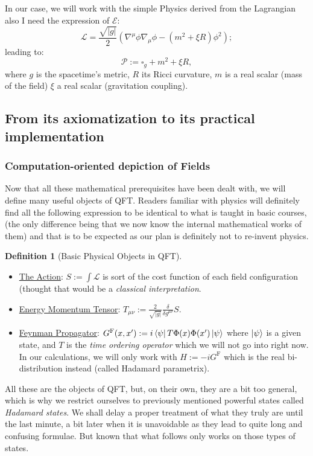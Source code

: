 \documentclass[a4paper,11pt]{article}
\numberwithin{equation}{section}
\theoremstyle{definition}
\newtheorem{definition}{Definition}
\begin{document}
        In our case, we will work with the simple Physics derived from the Lagrangian \color{red} also I need the expression of $\mathcal{E}$\color{black}:
        $$\mathcal{L}=\frac{\sqrt{|g|}}{2}\left(\nabla^\mu\phi\nabla_\mu\phi- (m^2+\xi R)\phi^2\right);$$
        leading to:
        $$\mathcal{P}:=\square_g + m^2 + \xi R,$$
        where $g$ is the spacetime's metric, $R$ its Ricci curvature, $m$ is a real scalar (mass of the field) $\xi$ a real scalar (gravitation coupling).

        
\subsection{From its axiomatization to its practical implementation}
\subsubsection{Computation-oriented depiction of Fields}
        Now that all these mathematical prerequisites have been dealt with, we will define many useful objects of QFT. Readers familiar with physics will definitely find all the following expression to be identical to what is taught in basic courses, (the only difference being that we now know the internal mathematical works of them) and that is to be expected as our plan is definitely not to re-invent physics.

        \begin{definition}[Basic Physical Objects in QFT]$\quad$
        \begin{itemize}
            \item \underline{The Action}: $S:= \int \mathcal{L}$ is sort of the cost function of each field configuration (thought that would be a \emph{classical interpretation}.
            \item \underline{Energy Momentum Tensor}: $T_{\mu\nu}:=\frac{2}{\sqrt{|g|}}\frac{\delta}{\delta g^{\mu\nu}}S.$
            \item \underline{Feynman Propagator}: $G^\mathrm{F}(x,x'):=i\bra{\psi}T\Phi(x)\Phi(x')\ket{\psi}$ where $\ket{\psi}$ is a given state, and $T$ is the \emph{time ordering operator} which we will not go into right now. In our calculations, we will only work with $H:=-iG^\mathrm{F}$ which is the real bi-distribution instead (called Hadamard parametrix). 
        \end{itemize}
        \end{definition}
        All these are the objects of QFT, but, on their own, they are a bit too general, which is why we restrict ourselves to previously mentioned powerful states called \emph{Hadamard states}. We shall delay a proper treatment of what they truly are until the last minute, a bit later when it is unavoidable as they lead to quite long and confusing formulae. But known that what follows only works on those types of states.
\end{document}
